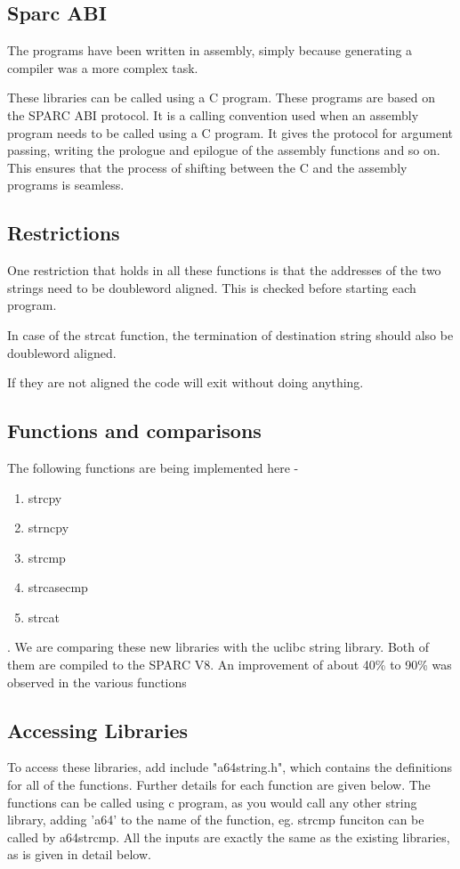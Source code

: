 \documentclass[12pt]{article}
\begin{document}
\subsection{Sparc ABI}
The programs have been written in assembly, simply because generating a compiler was a more complex task. 

These libraries can be called using a C program.
These programs are based on the SPARC ABI protocol. It is a calling convention used when an assembly program needs to be called using a C program.  It gives the protocol for argument passing, writing the prologue and epilogue of the assembly functions and so on. This ensures that the process of shifting between the C and the assembly programs is seamless. 

\subsection{Restrictions}

One restriction that holds in all these functions is that the addresses of the two strings need to be doubleword aligned. This is checked before starting each program.

In case of the strcat function, the termination of destination string should also be doubleword aligned.

If they are not aligned the code will exit without doing anything.

\subsection{Functions and comparisons}
The following functions are being implemented here -
\begin{enumerate}
    \item strcpy
    \item strncpy
    \item strcmp
    \item strcasecmp
    \item strcat
\end{enumerate}
.
We are comparing these new libraries with the uclibc string library. Both of them are compiled to the SPARC V8. An improvement of about 40\% to 90\% was observed in the various functions 


\subsection{Accessing Libraries}

To access these libraries, add include "a64string.h", which contains the definitions for all of the functions. Further details for each function are given below.\newline
The functions can be called using  c program, as you would call any other string library, adding 'a64' to the name of the function, eg. strcmp funciton can be called by a64strcmp. All the inputs are exactly the same as the existing libraries, as is given in detail below.
\end{document}
